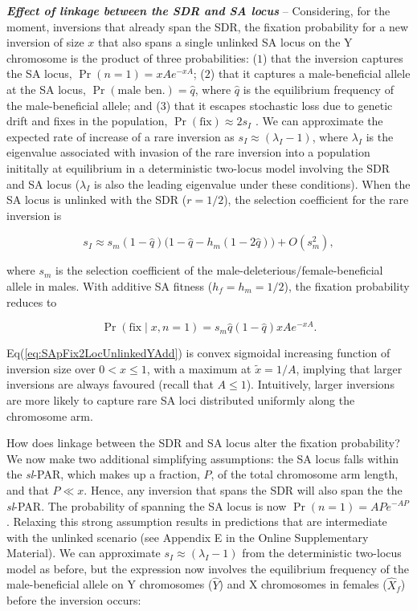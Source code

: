 \documentclass{article}
\newcommand\hl[1]{%
  \bgroup
  \hskip0pt\color{blue!80!black}%
  #1%
  \egroup
}
\begin{document}
{\bf \itshape Effect of linkage between the SDR and SA locus} -- Considering, for the moment, inversions that already span the SDR, the fixation probability for a new inversion of size $x$ that also spans a single unlinked SA locus on the Y chromosome is the product of three probabilities: ($1$) that the inversion captures the SA locus, $\Pr(n = 1) = xA e^{-xA}$; ($2$) that it captures a male-beneficial allele at the SA locus, $\Pr(\text{male~ben.}) = \hat{q}$, where $\hat{q}$ is the equilibrium frequency of the male-beneficial allele; and ($3$) that it escapes stochastic loss due to genetic drift and fixes in the population, $\Pr(\text{fix}) \approx 2 s_I$ \cite{Haldane1927}. We can approximate the expected rate of increase of a rare inversion as $s_I \approx (\lambda_I - 1)$, where $\lambda_I$ is the eigenvalue associated with invasion of the rare inversion into a population inititally at equilibrium in a deterministic two-locus model involving the SDR and SA locus ($\lambda_I$ is also the leading eigenvalue under these conditions). When the SA locus is unlinked with the SDR ($r = 1/2$), the selection coefficient for the rare inversion is

\begin{equation}\label{eq:SApFix2LocUnlinked}
	s_I \approx s_m (1 - \hat{q}) \big( 1 - \hat{q} - h_m(1 - 2\hat{q}) \big) + O(s_{m}^{2}),
\end{equation}

\noindent where $s_m$ is the selection coefficient of the male-deleterious/female-beneficial allele in males. With additive SA fitness ($h_f = h_m = 1/2$), the fixation probability reduces to

\begin{equation}\label{eq:SApFix2LocUnlinkedYAdd}
	\Pr(\text{fix} \mid x,n=1) = s_m \hat{q}(1 - \hat{q}) xA e^{-xA}.
\end{equation}

\noindent Eq(\ref{eq:SApFix2LocUnlinkedYAdd}) is convex sigmoidal increasing function of inversion size over $0 < x \leq 1$, with a maximum at $\tilde{x} = 1/A $, implying that larger inversions are always favoured (recall that $A \leq 1 $). Intuitively, larger inversions are more likely to capture rare SA loci distributed uniformly along the chromosome arm.

How does linkage between the SDR and SA locus alter the fixation probability? We now make two additional simplifying assumptions: the SA locus falls within the {\itshape sl}-PAR, which makes up a fraction, $P$, of the total chromosome arm length, and that $P \ll x$. Hence, any inversion that spans the SDR will also span the the {\itshape sl}-PAR. The probability of spanning the SA locus is now $\Pr(n = 1) = AP e^{-AP}$. Relaxing this strong assumption results in predictions that are intermediate with the unlinked scenario (see \hl{Appendix E} in the Online Supplementary Material). We can approximate $s_I \approx (\lambda_I - 1)$ from the deterministic two-locus model as before, but the expression now involves the equilibrium frequency of the male-beneficial allele on Y chromosomes ($\hat{Y}$) and X chromosomes in females ($\hat{X}_f$) before the inversion occurs:
\end{document}
